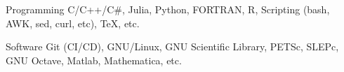 
\begin{cvskills}

	\cvskill
	{Programming}
    {C/C++/C\#, Julia, Python, FORTRAN, R, Scripting (bash, AWK, sed, curl, etc), \TeX, etc.}

	\cvskill
	{Software}
    {Git (CI/CD), GNU/Linux, GNU Scientific Library, PETSc, SLEPc, GNU Octave, Matlab, Mathematica, etc.}

\end{cvskills}
